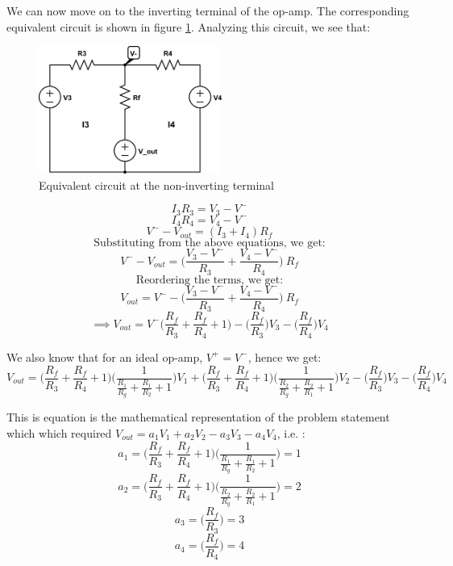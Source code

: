 \documentclass{article}
\theoremstyle{plain}
\theoremstyle{definition}
\theoremstyle{remark}
\begin{document}
We can now move on to the inverting terminal of the op-amp. The corresponding equivalent circuit is shown in figure \ref{q2_b2}.  Analyzing this circuit, we see that:
\begin{figure}[h]
\begin{center}
\includegraphics[width=6cm]{lab1_q2_kvl2.png}
\end{center}
\caption{Equivalent circuit at the non-inverting terminal}
\label{q2_b2}
\end{figure}
$$I_3R_3 = V_3 - V^-$$
$$I_4R_4 = V_4 - V^-$$
$$V^- - V_{out} = (I_3 + I_4)R_f $$
$$\text{Substituting from the above equations, we get:}$$
$$ V^- - V_{out} = \Big( \frac{ V_3 - V^-}{R_3} + \frac{ V_4 - V^-}{R_4}\Big) \ R_f$$
$$\text{Reordering the terms, we get:}$$
$$V_{out} =V^- -  \Big( \frac{ V_3 - V^-}{R_3} + \frac{ V_4 - V^-}{R_4}\Big) \ R_f $$
$$\implies V_{out} =V^- \Big( \frac{R_f}{R_3} + \frac{ R_f}{R_4} + 1\Big) - \Big( \frac{R_f}{R_3}\Big)V_3 - \Big( \frac{ R_f}{R_4}\Big)V_4$$

We also know that for an ideal op-amp, $V^+ = V^-$, hence we get:
$$ V_{out} = \Big( \frac{R_f}{R_3} + \frac{ R_f}{R_4} + 1\Big) \Big( \frac{1}{\frac{R_1}{R_g} + \frac{R_1}{R_2} + 1}\Big) V_1 + \Big( \frac{R_f}{R_3} + \frac{ R_f}{R_4} + 1\Big) \Big( \frac{1}{\frac{R_2}{R_g} + \frac{R_2}{R_1} + 1} \Big) V_2 - \Big( \frac{R_f}{R_3}\Big)V_3 - \Big( \frac{ R_f}{R_4}\Big)V_4$$

This is equation is the mathematical representation of the problem statement which which required $V_{out} = a_1V_1 + a_2 V_2 - a_3 V_3 - a_4 V_4$, i.e. :
$$a_1 =  \Big( \frac{R_f}{R_3} + \frac{ R_f}{R_4} + 1\Big) \Big( \frac{1}{\frac{R_1}{R_g} + \frac{R_1}{R_2} + 1}\Big) = 1$$
$$a_2 =  \Big( \frac{R_f}{R_3} + \frac{ R_f}{R_4} + 1\Big) \Big( \frac{1}{\frac{R_2}{R_g} + \frac{R_2}{R_1} + 1} \Big) = 2$$
$$a_3 = \Big( \frac{R_f}{R_3}\Big) = 3$$
$$a_4 = \Big( \frac{ R_f}{R_4}\Big) = 4$$
\end{document}
